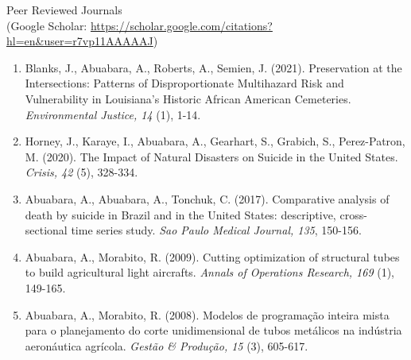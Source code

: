 \documentclass[11pt,oneside]{article}
\begin{document}
{Peer Reviewed Journals}\\{\small (Google Scholar: \url{https://scholar.google.com/citations?hl=en&user=r7vp11AAAAAJ})}
\begin{enumerate}[leftmargin=20pt]
\item Blanks, J., Abuabara, A., Roberts, A., Semien, J. (2021). Preservation at the Intersections: Patterns of Disproportionate Multihazard Risk and Vulnerability in Louisiana's Historic African American Cemeteries. \emph{Environmental Justice, 14} (1), 1-14.
\item Horney, J., Karaye, I., Abuabara, A., Gearhart, S., Grabich, S., Perez-Patron, M. (2020). The Impact of Natural Disasters on Suicide in the United States. \emph{Crisis, 42} (5), 328-334.
\item Abuabara, A., Abuabara, A., Tonchuk, C. (2017). Comparative analysis of death by suicide in Brazil and in the United States: descriptive, cross-sectional time series study. \emph{Sao Paulo Medical Journal, 135}, 150-156.
\item Abuabara, A., Morabito, R. (2009). Cutting optimization of structural tubes to build agricultural light aircrafts. \emph{Annals of Operations Research, 169} (1), 149-165.
\item Abuabara, A., Morabito, R. (2008). Modelos de programação inteira mista para o planejamento do corte unidimensional de tubos metálicos na indústria aeronáutica agrícola. \emph{Gestão \& Produção, 15} (3), 605-617.
\end{enumerate}

\vspace{3pt}
\end{document}
